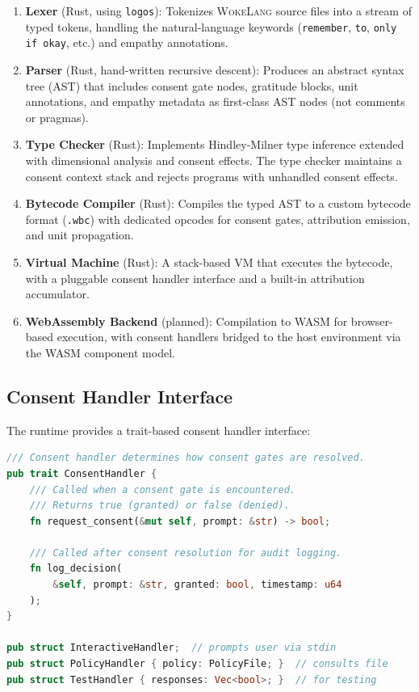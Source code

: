 \documentclass[11pt,a4paper]{article}
\newcommand{\WokeLang}{\textsc{WokeLang}}
\begin{document}
\begin{enumerate}
  \item \textbf{Lexer} (Rust, using \texttt{logos}): Tokenizes
    \WokeLang{} source files into a stream of typed tokens, handling
    the natural-language keywords (\texttt{remember}, \texttt{to},
    \texttt{only if okay}, etc.) and empathy annotations.

  \item \textbf{Parser} (Rust, hand-written recursive descent):
    Produces an abstract syntax tree (AST) that includes consent gate
    nodes, gratitude blocks, unit annotations, and empathy metadata as
    first-class AST nodes (not comments or pragmas).

  \item \textbf{Type Checker} (Rust): Implements Hindley-Milner type
    inference extended with dimensional analysis and consent effects.
    The type checker maintains a consent context stack and rejects
    programs with unhandled consent effects.

  \item \textbf{Bytecode Compiler} (Rust): Compiles the typed AST
    to a custom bytecode format (\texttt{.wbc}) with dedicated
    opcodes for consent gates, attribution emission, and unit
    propagation.

  \item \textbf{Virtual Machine} (Rust): A stack-based VM that
    executes the bytecode, with a pluggable consent handler interface
    and a built-in attribution accumulator.

  \item \textbf{WebAssembly Backend} (planned): Compilation to WASM
    for browser-based execution, with consent handlers bridged to the
    host environment via the WASM component model.
\end{enumerate}

\subsection{Consent Handler Interface}

The runtime provides a trait-based consent handler interface:

\begin{lstlisting}[language=Rust,caption={Consent handler trait (Rust)}]
/// Consent handler determines how consent gates are resolved.
pub trait ConsentHandler {
    /// Called when a consent gate is encountered.
    /// Returns true (granted) or false (denied).
    fn request_consent(&mut self, prompt: &str) -> bool;

    /// Called after consent resolution for audit logging.
    fn log_decision(
        &self, prompt: &str, granted: bool, timestamp: u64
    );
}

pub struct InteractiveHandler;  // prompts user via stdin
pub struct PolicyHandler { policy: PolicyFile; }  // consults file
pub struct TestHandler { responses: Vec<bool>; }  // for testing
\end{lstlisting}
\end{document}
